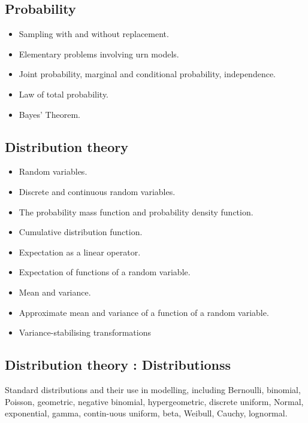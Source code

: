 \subsection*{Probability}
\begin{itemize}	
\item Sampling with and without replacement. 
\item Elementary problems involving urn models.
\item Joint probability, marginal and conditional probability, independence.
\item Law of total probability. 
\item Bayes' Theorem.
\end{itemize}

\subsection*{Distribution theory}

\begin{itemize}	
\item Random variables.
\item Discrete and continuous random variables. 
\item The probability mass function and probability density function. 
\item Cumulative  distribution function. 
\item Expectation as a linear operator. 
\item Expectation of functions of a random variable. 
\item Mean and variance.
\item Approximate mean and variance of a function of a random variable. 
\item Variance-stabilising transformations
\end{itemize}
\subsection*{Distribution theory : Distributionss}
Standard distributions and their use in modelling, including Bernoulli, binomial, Poisson, geometric, negative binomial, hypergeometric, discrete uniform, Normal, exponential, gamma, contin-uous uniform, beta, Weibull, Cauchy, lognormal.


